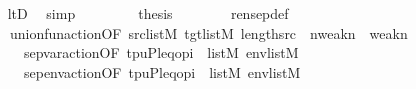\begin{isabellebody}
\ \ \ \ \ \ \isamarkupfalse%
\ ltD\ \isamarkupfalse%
\ simp\ \isanewline
\ \ \ \ \isamarkupfalse%
\ \isamarkupfalse%
\ {\isacharquery}{\kern0pt}thesis\isanewline
\ \ \ \ \ \ \isamarkupfalse%
\ rensep{\isacharunderscore}{\kern0pt}def\ \isamarkupfalse%
\ \ \isanewline
\ \ \ \ \ \ \ \ union{\isacharunderscore}{\kern0pt}fun{\isacharunderscore}{\kern0pt}action{\isacharbrackleft}{\kern0pt}OF\ {\isacartoucheopen}{\isacharquery}{\kern0pt}src{\isasymin}list{\isacharparenleft}{\kern0pt}M{\isacharparenright}{\kern0pt}{\isacartoucheclose}\ {\isacartoucheopen}{\isacharquery}{\kern0pt}tgt{\isasymin}list{\isacharparenleft}{\kern0pt}M{\isacharparenright}{\kern0pt}{\isacartoucheclose}\ {\isacartoucheopen}length{\isacharparenleft}{\kern0pt}{\isacharquery}{\kern0pt}src{\isacharparenright}{\kern0pt}\ {\isacharequal}{\kern0pt}\ {\isacharparenleft}{\kern0pt}{}{\isacharhash}{\kern0pt}{\isacharplus}{\kern0pt}{\isacharquery}{\kern0pt}n{\isacharminus}{\kern0pt}weak{\isacharparenleft}{\kern0pt}{\isacharquery}{\kern0pt}n{\isacharcomma}{\kern0pt}{}{\isacharparenright}{\kern0pt}{\isacharparenright}{\kern0pt}\ {\isasymunion}\ weak{\isacharparenleft}{\kern0pt}{\isacharquery}{\kern0pt}n{\isacharcomma}{\kern0pt}{}{\isacharparenright}{\kern0pt}{\isacartoucheclose}\isanewline
\ \ \ \ \ \ \ \ \ \ sep{\isacharunderscore}{\kern0pt}var{\isacharunderscore}{\kern0pt}action{\isacharbrackleft}{\kern0pt}OF\ {\isacartoucheopen}{\isacharbrackleft}{\kern0pt}t{\isacharcomma}{\kern0pt}p{\isacharcomma}{\kern0pt}u{\isacharcomma}{\kern0pt}P{\isacharcomma}{\kern0pt}leq{\isacharcomma}{\kern0pt}o{\isacharcomma}{\kern0pt}pi{\isacharbrackright}{\kern0pt}\ {\isasymin}\ list{\isacharparenleft}{\kern0pt}M{\isacharparenright}{\kern0pt}{\isacartoucheclose}\ {\isacartoucheopen}env{\isasymin}list{\isacharparenleft}{\kern0pt}M{\isacharparenright}{\kern0pt}{\isacartoucheclose}{\isacharbrackright}{\kern0pt}\ \ \ \ \ \ \isanewline
\ \ \ \ \ \ \ \ \ \ sep{\isacharunderscore}{\kern0pt}env{\isacharunderscore}{\kern0pt}action{\isacharbrackleft}{\kern0pt}OF\ {\isacartoucheopen}{\isacharbrackleft}{\kern0pt}t{\isacharcomma}{\kern0pt}p{\isacharcomma}{\kern0pt}u{\isacharcomma}{\kern0pt}P{\isacharcomma}{\kern0pt}leq{\isacharcomma}{\kern0pt}o{\isacharcomma}{\kern0pt}pi{\isacharbrackright}{\kern0pt}\ {\isasymin}\ list{\isacharparenleft}{\kern0pt}M{\isacharparenright}{\kern0pt}{\isacartoucheclose}\ {\isacartoucheopen}env{\isasymin}list{\isacharparenleft}{\kern0pt}M{\isacharparenright}{\kern0pt}{\isacartoucheclose}{\isacharbrackright}{\kern0pt}\isanewline

\end{isabellebody}

